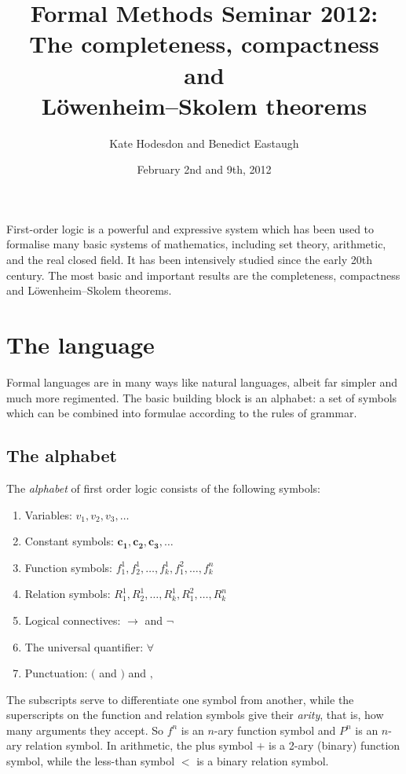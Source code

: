 \documentclass[10pt, a4paper, oneside]{article}
\title{Formal Methods Seminar 2012:\\
       The completeness, compactness and\\
       Löwenheim--Skolem theorems}
\author{Kate Hodesdon and Benedict Eastaugh}
\date{February 2nd and 9th, 2012}
\theoremstyle{definition}
\theoremstyle{remark}
\theoremstyle{plain}
\begin{document}
\maketitle

First-order logic is a powerful and expressive system which has been used to
formalise many basic systems of mathematics, including set theory, arithmetic,
and the real closed field. It has been intensively studied since the early 20th
century. The most basic and important results are the completeness, compactness
and Löwenheim--Skolem theorems.


\section{The language}

Formal languages are in many ways like natural languages, albeit far simpler and
much more regimented. The basic building block is an alphabet: a set of symbols
which can be combined into formulae according to the rules of grammar.

\subsection{The alphabet}

The \emph{alphabet} of first order logic consists of the following symbols:

\begin{enumerate}
    \item Variables: $v_1, v_2, v_3, \dotsc$
    \item Constant symbols: $\mathbf{c_1}, \mathbf{c_2}, \mathbf{c_3}, \dotsc$
    \item Function symbols: $f^1_1, f^1_2, \dotsc, f^1_k, f^2_1, \dotsc, f^n_k$
    \item Relation symbols: $R^1_1, R^1_2, \dotsc, R^1_k, R^2_1, \dotsc, R^n_k$
    \item Logical connectives: $\rightarrow$ and $\neg$
    \item The universal quantifier: $\forall$
    \item Punctuation: $($ and $)$ and $,$
\end{enumerate}

The subscripts serve to differentiate one symbol from another, while the
superscripts on the function and relation symbols give their \emph{arity}, that
is, how many arguments they accept. So $f^n$ is an $n$-ary function symbol and
$P^n$ is an $n$-ary relation symbol. In arithmetic, the plus symbol $+$ is a
2-ary (binary) function symbol, while the less-than symbol $<$ is a binary
relation symbol.
\end{document}

